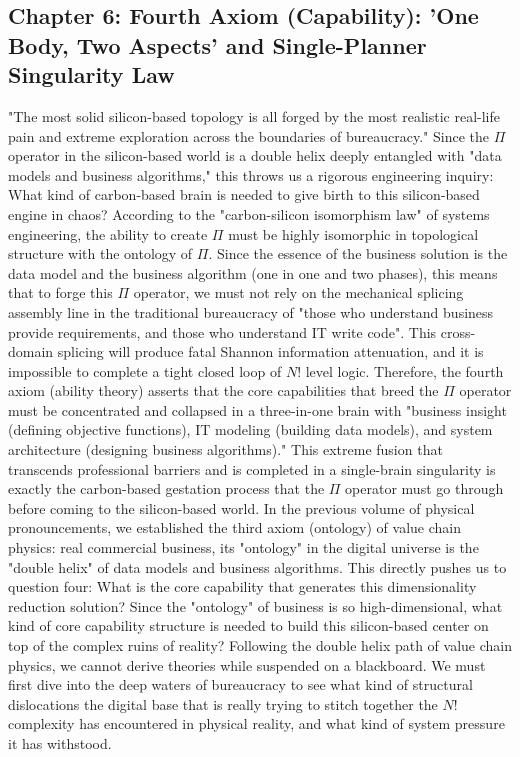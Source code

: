\documentclass[11pt,a4paper]{article}
\begin{document}
\subsection*{Chapter 6: Fourth Axiom (Capability): 'One Body, Two Aspects' and Single-Planner Singularity Law}
"The most solid silicon-based topology is all forged by the most realistic real-life pain and extreme exploration across the boundaries of bureaucracy." Since the $\Pi$ operator in the silicon-based world is a double helix deeply entangled with "data models and business algorithms," this throws us a rigorous engineering inquiry: What kind of carbon-based brain is needed to give birth to this silicon-based engine in chaos? According to the "carbon-silicon isomorphism law" of systems engineering, the ability to create $\Pi$ must be highly isomorphic in topological structure with the ontology of $\Pi$. Since the essence of the business solution is the data model and the business algorithm (one in one and two phases), this means that to forge this $\Pi$ operator, we must not rely on the mechanical splicing assembly line in the traditional bureaucracy of "those who understand business provide requirements, and those who understand IT write code". This cross-domain splicing will produce fatal Shannon information attenuation, and it is impossible to complete a tight closed loop of $N!$ level logic. Therefore, the fourth axiom (ability theory) asserts that the core capabilities that breed the $\Pi$ operator must be concentrated and collapsed in a three-in-one brain with "business insight (defining objective functions), IT modeling (building data models), and system architecture (designing business algorithms)." This extreme fusion that transcends professional barriers and is completed in a single-brain singularity is exactly the carbon-based gestation process that the $\Pi$ operator must go through before coming to the silicon-based world. In the previous volume of physical pronouncements, we established the third axiom (ontology) of value chain physics: real commercial business, its "ontology" in the digital universe is the "double helix" of data models and business algorithms. This directly pushes us to question four: What is the core capability that generates this dimensionality reduction solution? Since the "ontology" of business is so high-dimensional, what kind of core capability structure is needed to build this silicon-based center on top of the complex ruins of reality? Following the double helix path of value chain physics, we cannot derive theories while suspended on a blackboard. We must first dive into the deep waters of bureaucracy to see what kind of structural dislocations the digital base that is really trying to stitch together the $N!$ complexity has encountered in physical reality, and what kind of system pressure it has withstood.
\end{document}
